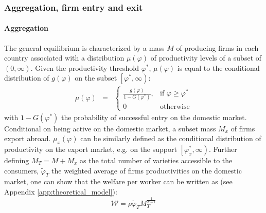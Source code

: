 \documentclass[a4paper,11pt]{article}
\begin{document}
\subsubsection{Aggregation, firm entry and exit}

\paragraph{Aggregation} The general equilibrium is characterized by a mass $M$ of producing firms in each country associated with a distribution $\mu(\varphi)$ of productivity levels of a subset of $\left(0,\infty\right)$. Given the productivity threshold $\varphi^\ast$, $\mu(\varphi)$ is equal to the conditional distribution of $g(\varphi)$ on the subset $\left[\varphi^\ast, \infty\right)$:
\begin{eqnarray}
\mu(\varphi) &=& \left\{
\begin{array}{ll}
\frac{g(\varphi)}{1-G(\varphi^\ast)}, & \text{if } \varphi\geq \varphi^\ast  \\
0 & \text{otherwise}
\end{array}
\right.  \label{eq:muofphi}
\end{eqnarray}
\noindent with $1-G(\varphi^\ast)$ the probability of successful entry on the domestic market. Conditional on being active on the domestic market, a subset mass $M_x$ of firms export abroad. $\mu_x(\varphi)$ can be similarly defined as the conditional distribution of productivity on the export market, e.g. on the support $\left[ \varphi^\ast_x,\infty\right)$.
Further defining $M_T = M+M_x$ as the total number of varieties accessible to the consumers, $\widetilde{\varphi}_T$ the weighted average of firms productivities on the domestic market, one can show that the welfare per worker can be written as (see Appendix \ref{app:theoretical_model}):
\begin{equation}
\mathcal{W} = \rho \widetilde{\varphi}_T M_T^{\frac{1}{\sigma-1}} \label{eq:Welfare}
\end{equation}
\end{document}
